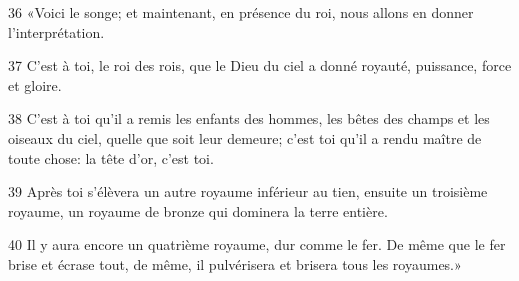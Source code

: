 
36 «Voici le songe; et maintenant, en présence du roi, nous allons en donner l’interprétation.

37 C’est à toi, le roi des rois, que le Dieu du ciel a donné royauté, puissance, force et gloire.

38 C’est à toi qu’il a remis les enfants des hommes, les bêtes des champs et les oiseaux du ciel, quelle que soit leur demeure; c’est toi qu’il a rendu maître de toute chose: la tête d’or, c’est toi.

39 Après toi s’élèvera un autre royaume inférieur au tien, ensuite un troisième royaume, un royaume de bronze qui dominera la terre entière.

40 Il y aura encore un quatrième royaume, dur comme le fer. De même que le fer brise et écrase tout, de même, il pulvérisera et brisera tous les royaumes.»
